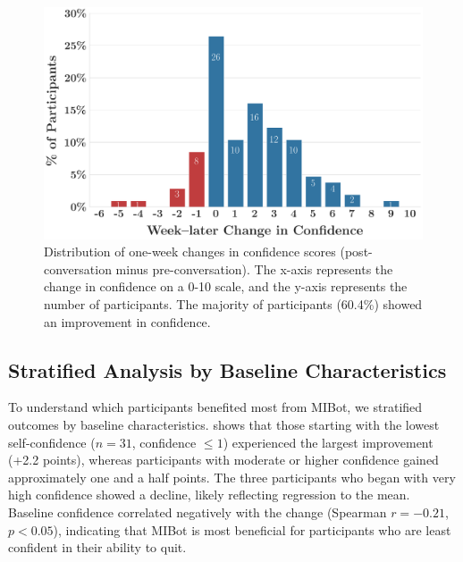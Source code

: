 \begin{figure}[ht]
	\centering
	\includegraphics[width=0.8\linewidth]{fig/2024-11-14-MIV6.3A-2024-11-22-MIV6.3A_ruler_deltas_delta_with_week_later_keep_high_conf_False_change.png}
	\caption[Distribution of Confidence Changes]{Distribution of one-week changes in confidence scores (post-conversation minus pre-conversation). The x-axis represents the change in confidence on a 0-10 scale, and the y-axis represents the number of participants. The majority of participants (60.4\%) showed an improvement in confidence.}
	\label{fig:confidence_change_distribution}
\end{figure}



\subsection*{Stratified Analysis by Baseline Characteristics}

To understand which participants benefited most from MIBot, we stratified outcomes by baseline characteristics.  shows that those starting with the lowest self-confidence ($n = 31$, confidence $\leq 1$) experienced the largest improvement (+2.2 points), whereas participants with moderate or higher confidence gained approximately one and a half points. The three participants who began with very high confidence showed a decline, likely reflecting regression to the mean. Baseline confidence correlated negatively with the change (Spearman $r = -0.21$, $p < 0.05$), indicating that MIBot is most beneficial for participants who are least confident in their ability to quit.

